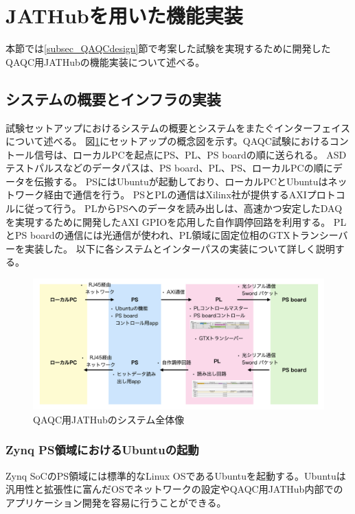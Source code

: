 \section{JATHubを用いた機能実装}
本節では\ref{subsec_QAQCdesign}節で考案した試験を実現するために開発したQAQC用JATHubの機能実装について述べる。

\subsection{システムの概要とインフラの実装}
\label{subsec_infra}
試験セットアップにおけるシステムの概要とシステムをまたぐインターフェイスについて述べる。
図\ref{JAThubinfra}にセットアップの概念図を示す。QAQC試験におけるコントール信号は、ローカルPCを起点にPS、PL、PS boardの順に送られる。
ASDテストパルスなどのデータパスは、PS board、PL、PS、ローカルPCの順にデータを伝搬する。
PSにはUbuntuが起動しており、ローカルPCとUbuntuはネットワーク経由で通信を行う。
PSとPLの通信はXilinx社が提供するAXIプロトコルに従って行う。
PLからPSへのデータを読み出しは、高速かつ安定したDAQを実現するために開発したAXI GPIOを応用した自作調停回路を利用する。
PLとPS boardの通信には光通信が使われ、PL領域に固定位相のGTXトランシーバーを実装した。
以下に各システムとインターパスの実装について詳しく説明する。

\begin{figure} 
\centering
\includegraphics[width=16cm]{fig/QAQC/JAThubinfra.png}
\caption[QAQC用JATHubのシステム全体像]{QAQC用JATHubのシステム全体像}
\label{JAThubinfra}
\end{figure}

\subsubsection{Zynq PS領域におけるUbuntuの起動}
\label{subsubsec_ubuntu}
\baselineskip
Zynq SoCのPS領域には標準的なLinux OSであるUbuntuを起動する。Ubuntuは汎用性と拡張性に富んだOSでネットワークの設定やQAQC用JATHub内部でのアプリケーション開発を容易に行うことができる。\par

